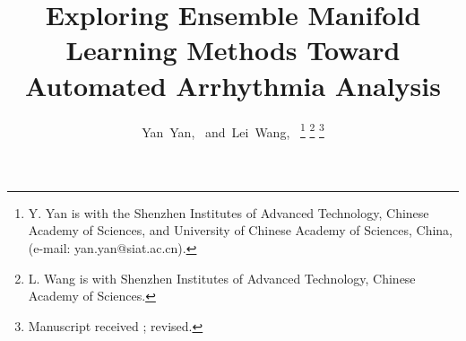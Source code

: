 \documentclass[journal]{IEEEtran}
\begin{document}
%
\title{Exploring Ensemble Manifold Learning Methods Toward Automated Arrhythmia Analysis}

%
%
%

\author{Yan~Yan,~
        and~Lei~Wang,~%
\thanks{Y. Yan is with the Shenzhen Institutes of Advanced Technology, Chinese Academy of Sciences, and University of Chinese Academy of Sciences, China, (e-mail: yan.yan@siat.ac.cn).}%
\thanks{L. Wang is with Shenzhen Institutes of Advanced Technology, Chinese Academy of Sciences.}%
\thanks{Manuscript received ; revised. }}

% 
%
\end{document}
